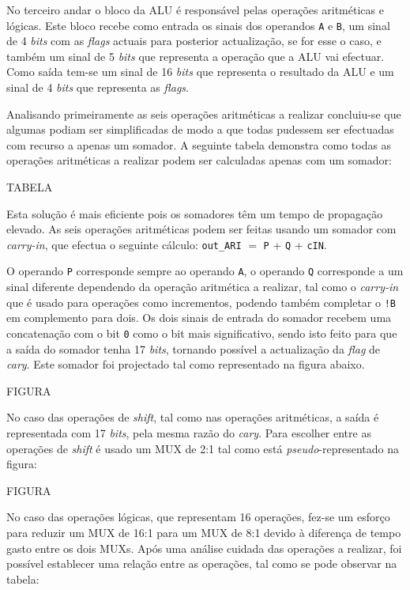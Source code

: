 \documentclass[11pt]{article}
\numberwithin{equation}{section}
\begin{document}
No terceiro andar o bloco da ALU é responsável pelas operações aritméticas e lógicas. Este bloco recebe como entrada os sinais dos operandos \texttt{A} e \texttt{B}, um sinal de 4 \textit{bits} com as \textit{flags} actuais para posterior actualização, se for esse o caso, e também um sinal de 5 \textit{bits} que representa a operação que a ALU vai efectuar. Como saída tem-se um sinal de 16 \textit{bits} que representa o resultado da ALU e um sinal de 4 \textit{bits} que representa as \textit{flags}.

Analisando primeiramente as seis operações aritméticas a realizar concluiu-se que algumas podiam ser simplificadas de modo a que todas pudessem ser efectuadas com recurso a apenas um somador. A seguinte tabela demonstra como todas as operações aritméticas a realizar podem ser calculadas apenas com um somador:

TABELA

Esta solução é mais eficiente pois os somadores têm um tempo de propagação elevado. As seis operações aritméticas podem ser feitas usando um somador com \textit{carry-in}, que efectua o seguinte cálculo: \texttt{out\_ARI} $=$ \texttt{P} + \texttt{Q} + \texttt{cIN}. 

O operando \texttt{P} corresponde sempre ao operando \texttt{A}, o operando \texttt{Q} corresponde a  um sinal diferente dependendo da operação aritmética a realizar, tal como o \textit{carry-in} que é usado para operações como incrementos, podendo também completar o \texttt{!B} em complemento para dois. Os dois sinais de entrada do somador recebem uma concatenação com o bit \texttt{0} como o bit mais significativo, sendo isto feito para que a saída do somador tenha 17 \textit{bits}, tornando possível a actualização da \textit{flag} de \textit{cary}. Este somador foi projectado tal como representado na figura abaixo.

FIGURA

No caso das operações de \textit{shift}, tal como nas operações aritméticas, a saída é representada com 17 \textit{bits}, pela mesma razão do \textit{cary}. Para escolher entre as operações de \textit{shift} é usado um MUX de 2:1 tal como está \textit{pseudo}-representado na figura:

FIGURA

No caso das operações lógicas, que representam 16 operações, fez-se um esforço para reduzir um MUX de 16:1 para um MUX de 8:1 devido à diferença de tempo gasto entre os dois MUXs. Após uma análise cuidada das operações a realizar, foi possível establecer uma relação entre as operações, tal como se pode observar na tabela:
\end{document}

